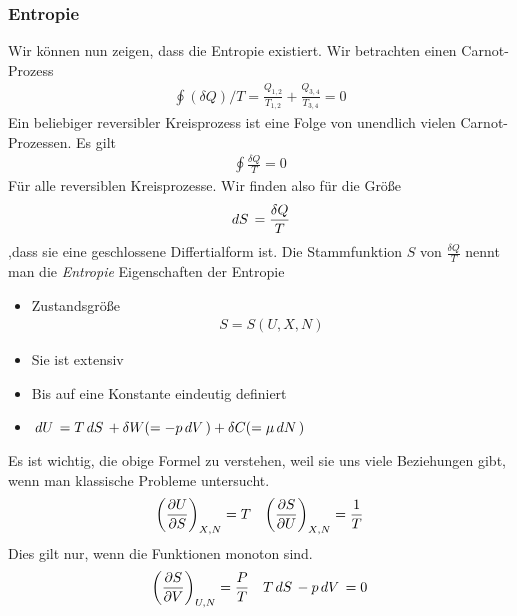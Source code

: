 \subsubsection*{Entropie}
Wir können nun zeigen, dass die Entropie existiert.
Wir betrachten einen Carnot-Prozess
%
\begin{align*}
  \oint (\delta Q)/T =\frac{Q_{1,2}}{T_{1,2}} +\frac{Q_{3,4}}{T_{3,4}} = 0
\end{align*}
%
Ein beliebiger reversibler Kreisprozess ist eine Folge von unendlich vielen
Carnot-Prozessen.
%
Es gilt
\begin{align*}
  \oint
\frac{\delta Q}{T} = 0 
\end{align*}
%
Für alle reversiblen Kreisprozesse. Wir finden also für die Größe
%
\begin{align*}
  \,dS\, =\frac{\delta Q}{T} 
\end{align*}
,dass sie eine geschlossene Differtialform ist.
Die Stammfunktion $S$ von $\frac{\delta Q}{T}$ nennt man die \emph{Entropie}
Eigenschaften der Entropie
\begin{itemize}
  \item Zustandsgröße
    \begin{align*}
      S = S (U, X, N)
    \end{align*}
  \item Sie ist extensiv
  \item Bis auf eine Konstante eindeutig definiert
  \item $ \,dU\, = T \,dS\, + \delta W(=-p \,dV\,) + \delta C (=\mu \,dN\,)$

\end{itemize}
    Es ist wichtig, die obige Formel zu verstehen, weil sie uns viele Beziehungen
    gibt, wenn man klassische Probleme untersucht.
%
\begin{align*}
  \left( \frac{\partial U }{\partial S} \right)_{X, N} = T && \left( \frac{\partial S }{\partial U} \right)_{X, N} =\frac{1}{T}
\end{align*}
%
Dies gilt nur, wenn die Funktionen monoton sind.
%
\begin{align*}
  \left( \frac{\partial S }{\partial V} \right)_{U, N} =\frac{P}{T} && T \,dS\, - p \,dV\, = 0
\end{align*}
%
